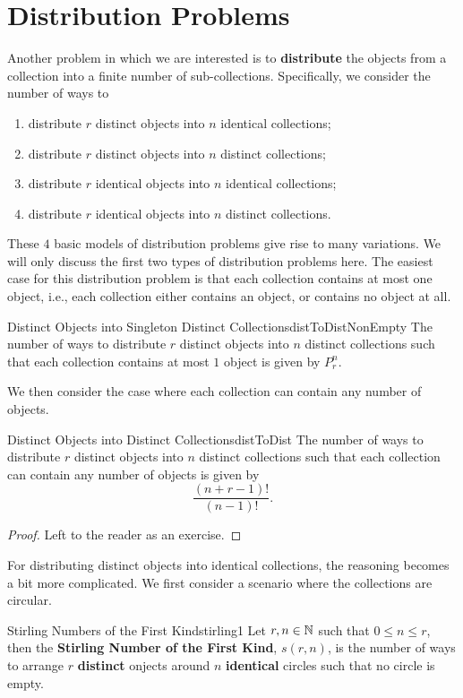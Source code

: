 \documentclass[math]{amznotes}
\theoremstyle{remark}
\newcommand{\0}{\mathbf{0}}
\newcommand{\1}{\mathbf{1}}
\begin{document}
\section{Distribution Problems}
Another problem in which we are interested is to \textbf{distribute} the objects from a collection into a finite number of sub-collections. Specifically, we consider the number of ways to
\begin{enumerate}
    \item distribute $r$ distinct objects into $n$ identical collections;
    \item distribute $r$ distinct objects into $n$ distinct collections;
    \item distribute $r$ identical objects into $n$ identical collections;
    \item distribute $r$ identical objects into $n$ distinct collections.
\end{enumerate}
These $4$ basic models of distribution problems give rise to many variations. We will only discuss the first two types of distribution problems here. The easiest case for this distribution problem is that each collection contains at most one object, i.e., each collection either contains an object, or contains no object at all.
\begin{probox}{Distinct Objects into Singleton Distinct Collections}{distToDistNonEmpty}
    The number of ways to distribute $r$ distinct objects into $n$ distinct collections such that each collection contains at most $1$ object is given by $P^n_r$.
\end{probox}
We then consider the case where each collection can contain any number of objects.
\begin{probox}{Distinct Objects into Distinct Collections}{distToDist}
    The number of ways to distribute $r$ distinct objects into $n$ distinct collections such that each collection can contain any number of objects is given by
    \begin{equation*}
        \frac{(n + r - 1)!}{(n - 1)!}.
    \end{equation*}
    \tcblower
    \begin{proof}
        Left to the reader as an exercise.
    \end{proof}
\end{probox}
For distributing distinct objects into identical collections, the reasoning becomes a bit more complicated. We first consider a scenario where the collections are circular.
\begin{dfnbox}{Stirling Numbers of the First Kind}{stirling1}
    Let $r, n \in \mathbb{N}$ such that $0 \leq n \leq r$, then the {\color{red} \textbf{Stirling Number of the First Kind}}, $s(r, n)$, is the number of ways to arrange $r$ {\color{red} \textbf{distinct}} onjects around $n$ {\color{red} \textbf{identical}} circles such that no circle is empty.
\end{dfnbox}
\end{document}
